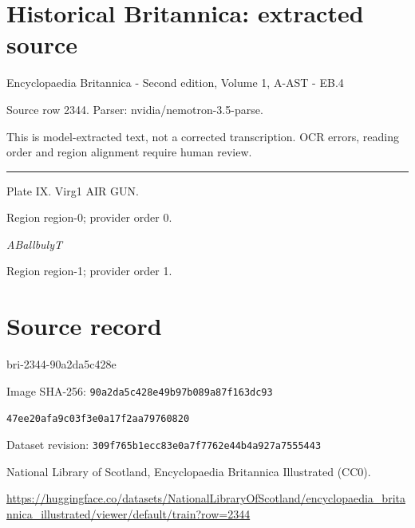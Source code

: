 \documentclass[11pt]{article}
\begin{document}
\section*{Historical Britannica: extracted source}
Encyclopaedia Britannica - Second edition, Volume 1, A-AST - EB.4\par
{\small Source row 2344. Parser: nvidia/nemotron-3.5-parse.\par}
{\small This is model-extracted text, not a corrected transcription. OCR errors, reading order and region alignment require human review.\par}
\hrule\medskip
Plate IX.
Virg1 AIR GUN.
\par

{\scriptsize\color{gray} Region region-0; provider order 0.\par}
\medskip

{\small\itshape ABallbulyT\par}

{\scriptsize\color{gray} Region region-1; provider order 1.\par}
\medskip
\newpage\section*{Source record}
bri-2344-90a2da5c428e\par
Image SHA-256: \texttt{90a2da5c428e49b97b089a87f163dc93}\par\texttt{47ee20afa9c03f3e0a17f2aa79760820}\par
Dataset revision: \texttt{309f765b1ecc83e0a7f7}\texttt{762e44b4a927a7555443}\par
National Library of Scotland, Encyclopaedia Britannica Illustrated (CC0).\par
\url{https://huggingface.co/datasets/NationalLibraryOfScotland/encyclopaedia_britannica_illustrated/viewer/default/train?row=2344}
\end{document}
